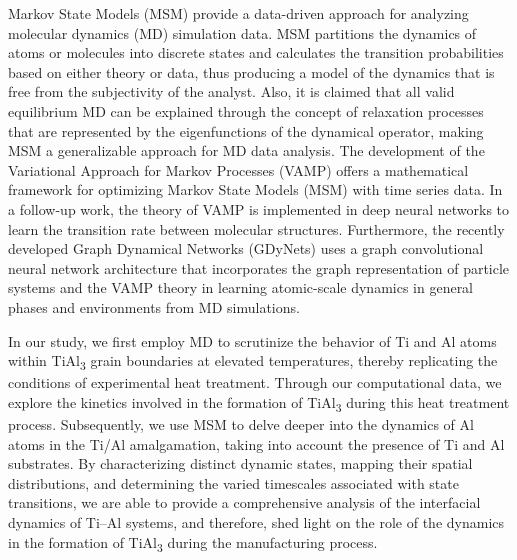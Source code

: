 Markov State Models (MSM) provide a data-driven approach for analyzing molecular dynamics (MD) simulation data. MSM partitions the dynamics of atoms or molecules into discrete states and calculates the transition probabilities based on either theory or data, thus producing a model of the dynamics that is free from the subjectivity of the analyst.\cite{prinz2011markov} Also, it is claimed that all valid equilibrium MD can be explained through the concept of relaxation processes that are represented by the eigenfunctions of the dynamical operator, making MSM a generalizable approach for MD data analysis.\cite{prinz2011markov} The development of the Variational Approach for Markov Processes (VAMP) offers a mathematical framework for optimizing Markov State Models (MSM) with time series data.\cite{wu2020variational} In a follow-up work, the theory of VAMP is implemented in deep neural networks to learn the transition rate between molecular structures.\cite{mardt2018vampnets} Furthermore, the recently developed Graph Dynamical Networks (GDyNets) uses a graph convolutional neural network architecture that incorporates the graph representation of particle systems and the VAMP theory in learning atomic-scale dynamics in general phases and environments from MD simulations.\cite{xie2019graph}

In our study, we first employ MD to scrutinize the behavior of Ti and Al atoms within TiAl\textsubscript{3} grain boundaries at elevated temperatures, thereby replicating the conditions of experimental heat treatment. Through our computational data, we explore the kinetics involved in the formation of TiAl\textsubscript{3} during this heat treatment process. Subsequently, we use MSM to delve deeper into the dynamics of Al atoms in the Ti/Al amalgamation, taking into account the presence of Ti and Al substrates. By characterizing distinct dynamic states, mapping their spatial distributions, and determining the varied timescales associated with state transitions, we are able to provide a comprehensive analysis of the interfacial dynamics of Ti--Al systems, and therefore, shed light on the role of the dynamics in the formation of TiAl\textsubscript{3} during the manufacturing process.
